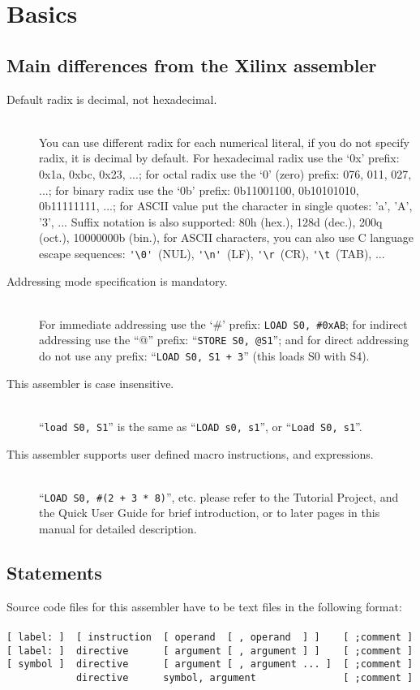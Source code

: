 \clearpage
\section{Basics}
    \subsection{Main differences from the Xilinx assembler}
        \begin{description}
            \item[Default radix is decimal, not hexadecimal.]~\\
                You can use different radix for each numerical literal, if you do not specify radix, it is decimal by default. For hexadecimal radix use the `0x' prefix: 0x1a, 0xbc, 0x23, ...; for octal radix use the `0' (zero) prefix: 076, 011, 027, ...; for binary radix use the `0b' prefix: 0b11001100, 0b10101010, 0b11111111, ...; for ASCII value put the character in single quotes: 'a', 'A', '3', ... Suffix notation is also supported: 80h (hex.), 128d (dec.), 200q (oct.), 10000000b (bin.), for ASCII characters, you can also use C language escape sequences: \verb"'\0'"~(NUL), \verb"'\n'"~(LF), \verb"'\r"~(CR), \verb"'\t"~(TAB), ...
            \item[Addressing mode specification is mandatory.]~\\
                For immediate addressing use the `\#' prefix: \texttt{LOAD~S0,~\#0xAB}; for indirect addressing use the ``@'' prefix: ``\texttt{STORE~S0,~@S1}''; and for direct addressing do not use any prefix: ``\texttt{LOAD~S0,~S1~+~3}'' (this loads S0 with S4).
            \item[This assembler is case insensitive.]~\\
                ``\texttt{load~S0,~S1}'' is the same as ``\texttt{LOAD~s0,~s1}'', or ``\texttt{Load~S0,~s1}''.
            \item[This assembler supports user defined macro instructions, and expressions.]~\\
                ``\texttt{LOAD~S0,~\#(2~+~3~*~8)}'', etc. please refer to the Tutorial Project, and the Quick User Guide for brief introduction, or to later pages in this manual for detailed description.
        \end{description}

    \clearpage
    \subsection{Statements}
        Source code files for this assembler have to be text files in the following format:
        ~\\\\
        \verb'[ label: ]  [ instruction  [ operand  [ , operand  ] ]    [ ;comment ]'\\
        \verb'[ label: ]  directive      [ argument [ , argument ] ]    [ ;comment ]'\\
        \verb'[ symbol ]  directive      [ argument [ , argument ... ]  [ ;comment ]'\\
        \verb'            directive      symbol, argument               [ ;comment ]'\\

